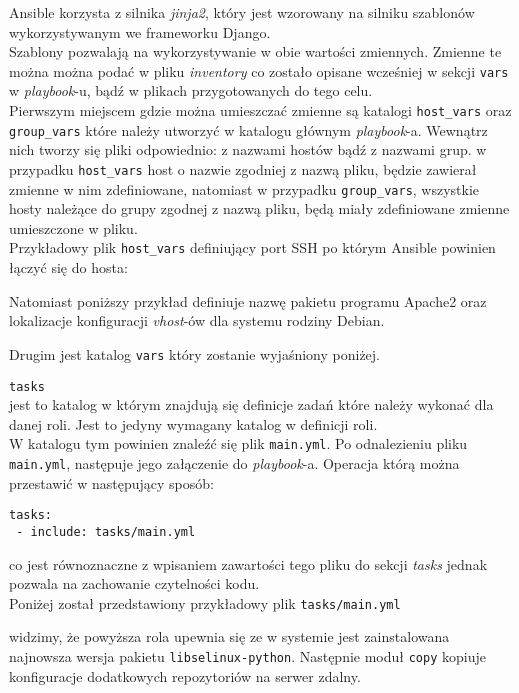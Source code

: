 \begin{description}
		Ansible korzysta z silnika \textit{jinja2}, który jest wzorowany na silniku szablonów wykorzystywanym we frameworku Django.\\
		Szablony pozwalają na wykorzystywanie w obie wartości zmiennych.
		Zmienne te można można podać w pliku \textit{inventory} co zostało opisane wcześniej w sekcji \texttt{vars} w \textit{playbook}-u, bądź w plikach przygotowanych do tego celu.\\
		Pierwszym miejscem gdzie można umieszczać zmienne są katalogi \texttt{host\_vars} oraz \texttt{group\_vars} które należy utworzyć w katalogu głównym \textit{playbook}-a.
		Wewnątrz nich tworzy się pliki odpowiednio: z nazwami hostów bądź z nazwami grup.
w przypadku \texttt{host\_vars} host o nazwie zgodniej z nazwą pliku, będzie zawierał zmienne w nim zdefiniowane, natomiast w przypadku \texttt{group\_vars}, wszystkie hosty należące do grupy zgodnej z nazwą pliku, będą miały zdefiniowane zmienne umieszczone w pliku.\\
		Przykładowy plik \texttt{host\_vars} definiujący port SSH po którym Ansible powinien łączyć się do hosta:
		
		Natomiast poniższy przykład definiuje nazwę pakietu programu Apache2 oraz lokalizacje konfiguracji \textit{vhost}-ów dla systemu rodziny Debian.
		
		Drugim jest katalog \texttt{vars} który zostanie wyjaśniony poniżej.
	\item{\texttt{tasks}}\\
		jest to katalog w którym znajdują się definicje zadań które należy wykonać dla danej roli.
		Jest to jedyny wymagany katalog w definicji roli.\\
		W katalogu tym powinien znaleźć się plik \texttt{main.yml}.
		Po odnalezieniu pliku \texttt{main.yml}, następuje jego załączenie do \textit{playbook}-a.
		Operacja którą można przestawić w następujący sposób:
		\begin{lstlisting}
tasks:
 - include: tasks/main.yml
		\end{lstlisting}
		co jest równoznaczne z wpisaniem zawartości tego pliku do sekcji \textit{tasks} jednak pozwala na zachowanie czytelności kodu.\\
		Poniżej został przedstawiony przykładowy plik \texttt{tasks/main.yml}
		
		widzimy, że powyższa rola upewnia się ze w systemie jest zainstalowana najnowsza wersja pakietu \texttt{libselinux-python}. Następnie moduł \texttt{copy} kopiuje konfiguracje dodatkowych repozytoriów na serwer zdalny.

\end{description}

